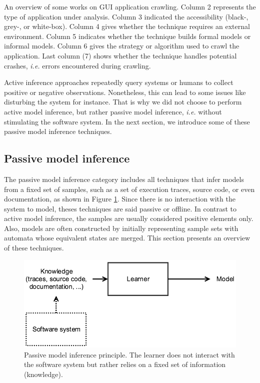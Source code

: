 \begin{table}
    \caption{An overview of some works on GUI application
    crawling. Column 2 represents the type of application under
    analysis. Column 3 indicated the accessibility (black-,
    grey-, or white-box). Column 4 gives whether the technique
    requires an external environment. Column 5 indicates whether
    the technique builds formal models or informal models. Column
    6 gives the strategy or algorithm used to crawl the
    application. Last column (7) shows whether the technique
    handles potential crashes, \emph{i.e.} errors encountered
    during crawling.}
	\label{table:gui_works}
\end{table}

Active inference approaches repeatedly query systems or humans to
collect positive or negative observations. Nonetheless, this can
lead to some issues like disturbing the system for instance.
That is why we did not choose to perform active model inference,
but rather passive model inference, \emph{i.e.} without
stimulating the software system. In the next section, we
introduce some of these passive model inference techniques.


\subsection{Passive model inference}
\label{sec:passive}

The passive model inference category includes all techniques that
infer models from a fixed set of samples, such as a set of
execution traces, source code, or even documentation, as shown in
Figure \ref{fig:passive}. Since there is no interaction with the
system to model, theses techniques are said passive or offline.
In contrast to active model inference, the samples are usually
considered positive elements only. Also, models are often
constructed by initially representing sample sets with automata
whose equivalent states are merged. This section presents an
overview of these techniques.

\begin{figure}[ht]
    \begin{center}
        \includegraphics[width=1.0\linewidth]{figures/passive.png}
    \end{center}

    \caption{Passive model inference principle. The learner does
    not interact with the software system but rather relies on
    a fixed set of information (knowledge).}
    \label{fig:passive}
\end{figure}

